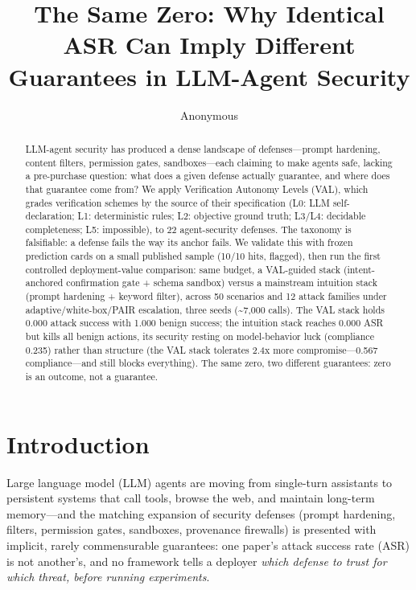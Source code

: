 \documentclass[11pt]{article}
\title{The Same Zero: Why Identical ASR Can Imply Different Guarantees in LLM-Agent Security}
\author{Anonymous}
\begin{document}
\maketitle
\nolinenumbers  %


\begin{abstract}

LLM-agent security has produced a dense landscape of defenses---prompt hardening, content filters, permission gates, sandboxes---each claiming to make agents safe, lacking a pre-purchase question: what does a given defense actually guarantee, and where does that guarantee come from? We apply Verification Autonomy Levels (VAL), which grades verification schemes by the source of their specification (L0: LLM self-declaration; L1: deterministic rules; L2: objective ground truth; L3/L4: decidable completeness; L5: impossible), to 22 agent-security defenses. The taxonomy is falsifiable: a defense fails the way its anchor fails. We validate this with frozen prediction cards on a small published sample (10/10 hits, flagged), then run the first controlled deployment-value comparison: same budget, a VAL-guided stack (intent-anchored confirmation gate + schema sandbox) versus a mainstream intuition stack (prompt hardening + keyword filter), across 50 scenarios and 12 attack families under adaptive/white-box/PAIR escalation, three seeds (\textasciitilde7,000 calls). The VAL stack holds 0.000 attack success with 1.000 benign success; the intuition stack reaches 0.000 ASR but kills all benign actions, its security resting on model-behavior luck (compliance 0.235) rather than structure (the VAL stack tolerates 2.4x more compromise---0.567 compliance---and still blocks everything). The same zero, two different guarantees: zero is an outcome, not a guarantee.

\end{abstract}
\section{Introduction}\label{introduction}

Large language model (LLM) agents are moving from single-turn assistants to persistent systems that call tools, browse the web, and maintain long-term memory---and the matching expansion of security defenses (prompt hardening, filters, permission gates, sandboxes, provenance firewalls) is presented with implicit, rarely commensurable guarantees: one paper's attack success rate (ASR) is not another's, and no framework tells a deployer \emph{which defense to trust for which threat, before running experiments}.
\end{document}
